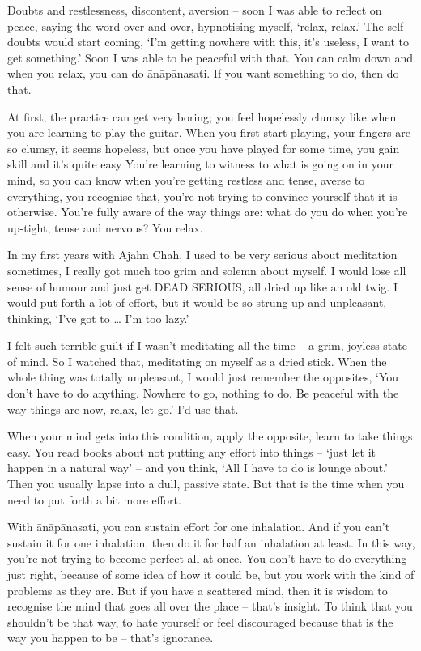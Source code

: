 Doubts and restlessness, discontent, aversion -- soon I was able to reflect on peace, saying the word over and over, hypnotising myself, `relax, relax.' The self doubts would start coming, `I'm getting nowhere with this, it's useless, I want to get something.' Soon I was able to be peaceful with that. You can calm down and when you relax, you can do ānāpānasati. If you want something to do, then do that.

At first, the practice can get very boring; you feel hopelessly clumsy like when you are learning to play the guitar. When you first start playing, your fingers are so clumsy, it seems hopeless, but once you have played for some time, you gain skill and it's quite easy You're learning to witness to what is going on in your mind, so you can know when you're getting restless and tense, averse to everything, you recognise that, you're not trying to convince yourself that it is otherwise. You're fully aware of the way things are: what do you do when you're up-tight, tense and nervous? You relax.

In my first years with Ajahn Chah, I used to be very serious about meditation sometimes, I really got much too grim and solemn about myself. I would lose all sense of humour and just get DEAD SERIOUS, all dried up like an old twig. I would put forth a lot of effort, but it would be so strung up and unpleasant, thinking, `I've got to \ldots{} I'm too lazy.'

I felt such terrible guilt if I wasn't meditating all the time -- a grim, joyless state of mind. So I watched that, meditating on myself as a dried stick. When the whole thing was totally unpleasant, I would just remember the opposites, `You don't have to do anything. Nowhere to go, nothing to do. Be peaceful with the way things are now, relax, let go.' I'd use that.

When your mind gets into this condition, apply the opposite, learn to take things easy. You read books about not putting any effort into things -- `just let it happen in a natural way' -- and you think, `All I have to do is lounge about.' Then you usually lapse into a dull, passive state. But that is the time when you need to put forth a bit more effort.

With ānāpānasati, you can sustain effort for one inhalation. And if you can't sustain it for one inhalation, then do it for half an inhalation at least. In this way, you're not trying to become perfect all at once. You don't have to do everything just right, because of some idea of how it could be, but you work with the kind of problems as they are. But if you have a scattered mind, then it is wisdom to recognise the mind that goes all over the place -- that's insight. To think that you shouldn't be that way, to hate yourself or feel discouraged because that is the way you happen to be -- that's ignorance.

